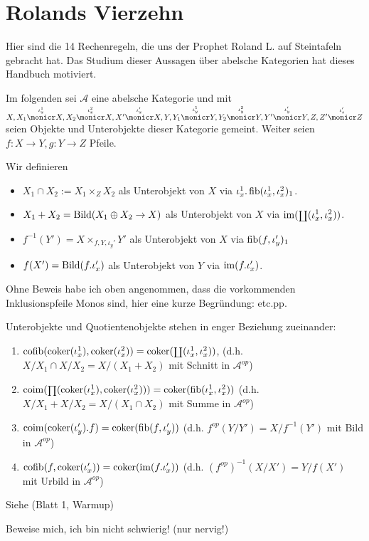 \section{Rolands Vierzehn}

Hier sind die 14 Rechenregeln, die uns der Prophet Roland L. auf Steintafeln gebracht hat. Das Studium dieser Aussagen über abelsche Kategorien hat dieses Handbuch motiviert.

Im folgenden sei $\mathcal A$ eine abelsche Kategorie und mit $X,
X_1 \overset{\iota_x^1}\monicr X,
X_2 \overset{\iota_x^2}\monicr X,
X'  \overset{\iota_x'}\monicr X,
Y,
Y_1 \overset{\iota_y^1}\monicr Y,
Y_2 \overset{\iota_y^2}\monicr Y,
Y'  \overset{\iota_y'}\monicr Y,
Z,
Z'  \overset{\iota_z'}\monicr Z$
seien Objekte und Unterobjekte dieser Kategorie gemeint.
Weiter seien $f:X\to Y, g:Y\to Z$ Pfeile.

\begin{defn}[Objektnotation]
Wir definieren
\begin{itemize}
\item $X_1 \cap X_2 := X_1\times_Z X_2$ als Unterobjekt von $X$ via $\iota_x^1.\operatorname{fib}(\iota_x^1, \iota_x^2)_1$.
\item $X_1+X_2 = \operatorname{Bild}(X_1 \oplus X_2 \to X)$ als Unterobjekt von $X$ via $\operatorname{im}(\operatorname{\scriptstyle\coprod}(\iota_x^1,\iota_x^2))$.
\item $f^{-1}(Y') = X \times_{f,Y,\iota_y'} Y'$ als Unterobjekt von $X$ via $\operatorname{fib}(f,\iota_y')_1$
\item $f(X') = \operatorname{Bild}(f.\iota_x')$ als Unterobjekt von $Y$ via $\operatorname{im}(f.\iota_x')$.
\end{itemize}
\end{defn}

\begin{bem}
Ohne Beweis habe ich oben angenommen, dass die vorkommenden Inklusionspfeile Monos sind, hier eine kurze Begründung: etc.pp. %
\end{bem}

\begin{prop}[Reflexionsprinzip]
Unterobjekte und Quotientenobjekte stehen in enger Beziehung zueinander:
\begin{enumerate}
\item $\operatorname{cofib}(\operatorname{coker}(\iota_x^1), \operatorname{coker}(\iota_x^2)) = \operatorname{coker}(\operatorname{\scriptstyle\coprod}(\iota_x^1,\iota_x^2))$, (d.h. $X/X_1 \cap X/X_2 = X/(X_1+X_2)$ mit Schnitt in $\mathcal A^{op}$)
\item $\operatorname{coim}(\operatorname{\scriptstyle\prod}(\operatorname{coker}(\iota_x^1),\operatorname{coker}(\iota_x^2))) = \operatorname{coker}(\operatorname{fib}(\iota_x^1,\iota_x^2))$ (d.h. $X/X_1 + X/X_2 = X/(X_1\cap X_2)$ mit Summe in $\mathcal A^{op}$)
\item $\operatorname{coim}(\operatorname{coker}(\iota_y').f) = \operatorname{coker}(\operatorname{fib}(f,\iota_y'))$ (d.h. $f^{op}(Y/Y') = X/f^{-1}(Y')$ mit Bild in $\mathcal A^{op}$)
\item $\operatorname{cofib}(f,\operatorname{coker}(\iota_x')) = \operatorname{coker}(\operatorname{im}(f.\iota_x'))$ (d.h. $(f^{op})^{-1}(X/X') = Y/f(X')$ mit Urbild in $\mathcal A^{op}$)
\end{enumerate}
Siehe (Blatt 1, Warmup)
\end{prop}
\begin{bew}
Beweise mich, ich bin nicht schwierig! (nur nervig!)
\end{bew}

